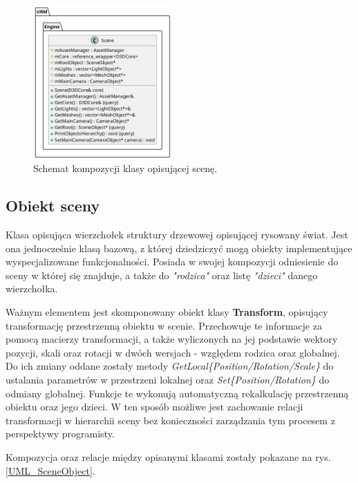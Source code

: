 	\begin{figure}[h!]
		\centering
		\includegraphics[width=200px]{images/UML/scene.png}
		\caption{Schemat kompozycji klasy opisującej scenę.}
		\label{UML_Scene}
	\end{figure}
	
	
\subsection{Obiekt sceny}
	Klasa opisująca wierzchołek struktury drzewowej opisującej rysowany świat. Jest ona jednocześnie klasą bazową, z której dziedziczyć mogą obiekty implementujące wyspecjalizowane funkcjonalności. Posiada w swojej kompozycji odniesienie do sceny w której się znajduje, a także do \textit{"rodzica"} oraz listę \textit{"dzieci"} danego wierzchołka. 
	
	Ważnym elementem jest skomponowany obiekt klasy \textbf{Transform}, opisujący transformację przestrzenną obiektu w scenie. Przechowuje te informacje za pomocą macierzy transformacji, a także wyliczonych na jej podstawie wektory pozycji, skali oraz rotacji w dwóch wersjach - względem rodzica oraz globalnej. Do ich zmiany oddane zostały metody \textit{GetLocal\{Position/Rotation/Scale\}} do ustalania parametrów w przestrzeni lokalnej oraz \textit{Set\{Position/Rotation\}} do odmiany globalnej. Funkcje te wykonują automatyczną rekalkulację przestrzenną obiektu oraz jego dzieci. W ten sposób możliwe jest zachowanie relacji transformacji w hierarchii sceny bez konieczności zarządzania tym procesem z perspektywy programisty.
	
	Kompozycja oraz relacje między opisanymi klasami zostały pokazane na rys. \ref{UML_SceneObject}.
	
